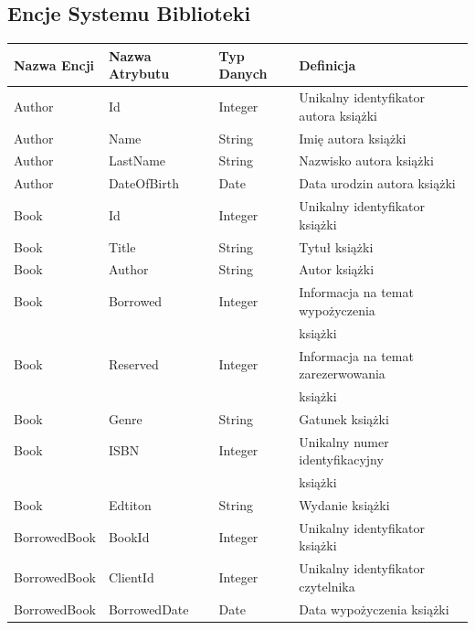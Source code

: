 \documentclass[12pt]{article}
\begin{document}
\subsection*{Encje Systemu Biblioteki}
\begin{table}[!ht]
    \centering
    \begin{tabularx}{1.01\textwidth}{llll}
        \toprule
        Nazwa Encji & Nazwa Atrybutu & Typ Danych &Definicja \\
        \bottomrule
        \toprule
        Author & Id & Integer & Unikalny identyfikator autora książki \\
        \bottomrule
        Author & Name & String & Imię autora książki \\
        \bottomrule
        Author & LastName & String & Nazwisko autora książki \\
        \bottomrule
        Author & DateOfBirth & Date & Data urodzin autora książki \\
        \bottomrule
        Book & Id & Integer & Unikalny identyfikator książki \\
        \bottomrule
        Book & Title & String & Tytuł książki \\
        \bottomrule
        Book & Author & String & Autor książki \\
        \bottomrule
        Book & Borrowed & Integer & Informacja na temat wypożyczenia \\
         &  &  &                    książki \\
        \bottomrule
        Book & Reserved & Integer & Informacja na temat zarezerwowania \\
        &  &  &                    książki \\
        \bottomrule
        Book & Genre & String & Gatunek książki \\
        \bottomrule
        Book & ISBN & Integer & Unikalny numer identyfikacyjny \\
        &  &  &                    książki \\
        \bottomrule
        Book & Edtiton & String & Wydanie książki \\
        \bottomrule
        BorrowedBook & BookId & Integer & Unikalny identyfikator książki \\
        \bottomrule
        BorrowedBook & ClientId & Integer & Unikalny identyfikator czytelnika \\
        \bottomrule
        BorrowedBook & BorrowedDate & Date & Data wypożyczenia książki \\
        \bottomrule
    \end{tabularx}
\end{table}
\end{document}
